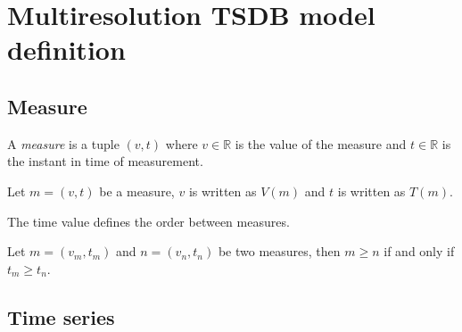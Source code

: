 \section{Multiresolution TSDB model definition}

\subsection{Measure}

\begin{definition}[Measure]
  \label{def:measure}
  A \emph{measure} is a tuple $(v,t)$ where $v\in{\mathbb{R}}$ is the
  value of the measure and $t \in \mathbb{R}$ is the instant in time
  of measurement.
\end{definition}

Let $m=(v,t)$ be a measure, $v$ is written as $V(m)$ and $t$
is written as $T(m)$.




The time value defines the order between measures.

\begin{definition}
  \label{def:order-relation}
  Let $m=(v_m,t_m)$ and $n=(v_n,t_n)$ be two measures, then $m\geq n$
  if and only if $t_m\geq t_n$.
\end{definition}

\subsection{Time series}

